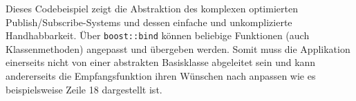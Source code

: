 

Dieses Codebeispiel zeigt die Abstraktion des komplexen optimierten Publish/Subscribe-Systems und dessen einfache und unkomplizierte Handhabbarkeit. Über \texttt{boost::bind} können beliebige Funktionen (auch Klassenmethoden) angepasst und übergeben werden. Somit muss die Applikation einerseits nicht von einer abstrakten Basisklasse abgeleitet sein und kann andererseits die Empfangsfunktion ihren Wünschen nach anpassen wie es beispielsweise Zeile 18 dargestellt ist.




